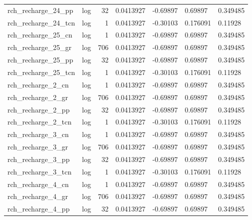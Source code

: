 \documentclass{article}
\begin{document}
\begin{center}
\begin{landscape}
\begin{longtable}{llrllll}
 rch\_recharge\_24\_pp &       log &     32 &      0.0413927 &       -0.69897 &        0.69897 &           0.349485 \\
rch\_recharge\_24\_tcn &       log &      1 &      0.0413927 &       -0.30103 &       0.176091 &            0.11928 \\
 rch\_recharge\_25\_cn &       log &      1 &      0.0413927 &       -0.69897 &        0.69897 &           0.349485 \\
 rch\_recharge\_25\_gr &       log &    706 &      0.0413927 &       -0.69897 &        0.69897 &           0.349485 \\
 rch\_recharge\_25\_pp &       log &     32 &      0.0413927 &       -0.69897 &        0.69897 &           0.349485 \\
rch\_recharge\_25\_tcn &       log &      1 &      0.0413927 &       -0.30103 &       0.176091 &            0.11928 \\
  rch\_recharge\_2\_cn &       log &      1 &      0.0413927 &       -0.69897 &        0.69897 &           0.349485 \\
  rch\_recharge\_2\_gr &       log &    706 &      0.0413927 &       -0.69897 &        0.69897 &           0.349485 \\
  rch\_recharge\_2\_pp &       log &     32 &      0.0413927 &       -0.69897 &        0.69897 &           0.349485 \\
 rch\_recharge\_2\_tcn &       log &      1 &      0.0413927 &       -0.30103 &       0.176091 &            0.11928 \\
  rch\_recharge\_3\_cn &       log &      1 &      0.0413927 &       -0.69897 &        0.69897 &           0.349485 \\
  rch\_recharge\_3\_gr &       log &    706 &      0.0413927 &       -0.69897 &        0.69897 &           0.349485 \\
  rch\_recharge\_3\_pp &       log &     32 &      0.0413927 &       -0.69897 &        0.69897 &           0.349485 \\
 rch\_recharge\_3\_tcn &       log &      1 &      0.0413927 &       -0.30103 &       0.176091 &            0.11928 \\
  rch\_recharge\_4\_cn &       log &      1 &      0.0413927 &       -0.69897 &        0.69897 &           0.349485 \\
  rch\_recharge\_4\_gr &       log &    706 &      0.0413927 &       -0.69897 &        0.69897 &           0.349485 \\
  rch\_recharge\_4\_pp &       log &     32 &      0.0413927 &       -0.69897 &        0.69897 &           0.349485 \\

\end{longtable}
\end{landscape}
\end{center}
\end{document}
